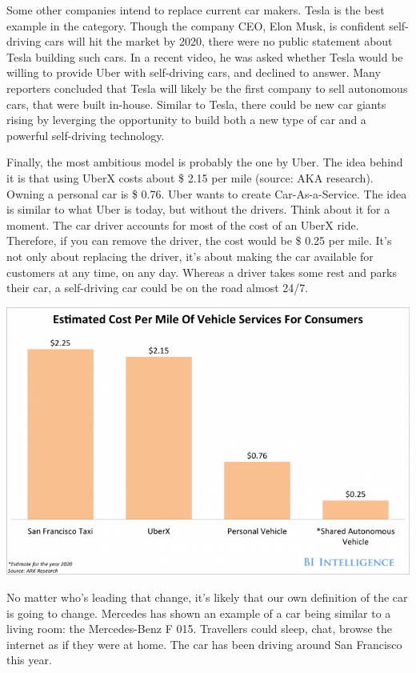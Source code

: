 \documentclass[12pt]{article}
\begin{document}
Some other companies intend to replace current car makers. Tesla is the best
example in the category. Though the company CEO, Elon Musk, is confident
self-driving cars will hit the market by 2020, there were no public statement
about Tesla building such cars. In a recent video, he was asked whether Tesla
would be willing to provide Uber with self-driving cars, and declined to answer.
Many reporters concluded that Tesla will likely be the first company to sell
autonomous cars, that were built in-house. Similar to Tesla, there could be new
car giants rising by leverging the opportunity to build both a new type of car
and a powerful self-driving technology.

Finally, the most ambitious model is probably the one by Uber. The idea behind
it is that using UberX costs about \$ 2.15 per mile (source: AKA research).
Owning a personal car is \$ 0.76. Uber wants to create Car-As-a-Service.
The idea is similar to what Uber is today, but without the drivers. Think about
it for a moment. The car driver accounts for most of the cost of an UberX ride.
Therefore, if you can remove the driver, the cost would be \$ 0.25 per mile.
It's not only about replacing the driver, it's about making the car available
for customers at any time, on any day. Whereas a driver takes some rest and
parks their car, a self-driving car could be on the road almost 24/7.

\medskip
\includegraphics[width=\textwidth]{vehicle-cost}
\smallskip

No matter who's leading that change, it's likely that our own definition of the
car is going to change. Mercedes has shown an example of a car being similar to
a living room: the Mercedes-Benz F 015. Travellers could sleep, chat, browse the
internet as if they were at home. The car has been driving around San Francisco
this year.
\end{document}
